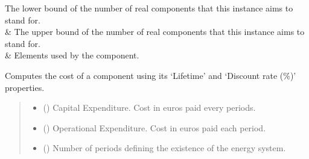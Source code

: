 \documentclass[letterpaper,10pt,english]{sphinxmanual}
\begin{document}
\begin{fulllineitems}
\begin{savenotes}
\begin{tabulary}{\linewidth}[t]{}
The lower bound of the number of real components that this instance aims to stand for.
\\
\hline
\sphinxAtStartPar
{\hyperref[\detokenize{generated/tamos.production.CompHP:tamos.production.CompHP.units_number_ub}]{}}
&
\sphinxAtStartPar
The upper bound of the number of real components that this instance aims to stand for.
\\
\hline
\sphinxAtStartPar
{\hyperref[\detokenize{generated/tamos.production.CompHP:tamos.production.CompHP.used_elements}]{}}
&
\sphinxAtStartPar
Elements used by the component.
\\
\hline
\end{tabulary}
\par
\sphinxattableend\end{savenotes}

\begin{fulllineitems}
\label{\detokenize{generated/tamos.production.CompHP:tamos.production.CompHP.compute_actualized_cost}}
\pysigstartsignatures
{}
\pysigstopsignatures
\sphinxAtStartPar
Computes the cost of a component using its ‘Lifetime’ and ‘Discount rate (\%)’ properties.
\begin{quote}\begin{description}
\begin{itemize}
\item {} 
\sphinxAtStartPar
{} () \textendash{} Capital Expenditure. Cost in euros paid every  periods.

\item {} 
\sphinxAtStartPar
{} () \textendash{} Operational Expenditure. Cost in euros paid each period.

\item {} 
\sphinxAtStartPar
{} () \textendash{} Number of periods defining the existence of the energy system.


\end{itemize}
\end{description}
\end{quote}
\end{fulllineitems}
\end{fulllineitems}
\end{document}
